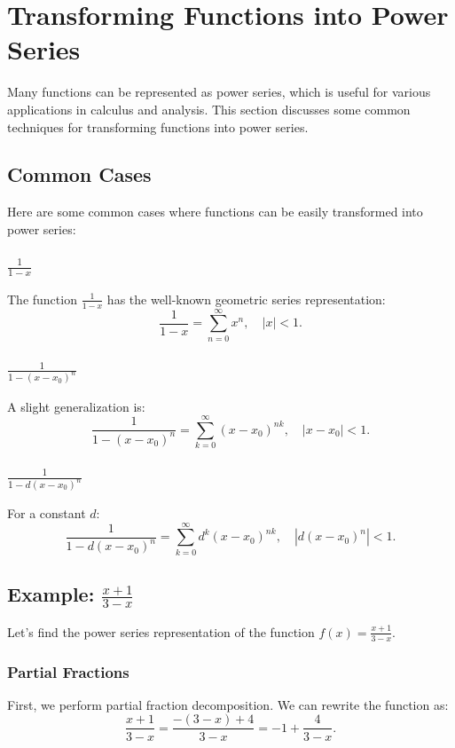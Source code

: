 \section{Transforming Functions into Power Series}

Many functions can be represented as power series, which is useful for various applications in calculus and analysis. This section discusses some common techniques for transforming functions into power series.

\subsection{Common Cases}
Here are some common cases where functions can be easily transformed into power series:

\subsubsection{\(\frac{1}{1 - x}\)}
The function \(\frac{1}{1 - x}\) has the well-known geometric series representation:
\[
\frac{1}{1 - x} = \sum_{n=0}^{\infty} x^n, \quad |x| < 1.
\]

\subsubsection{\(\frac{1}{1 - (x - x_0)^n}\)}
A slight generalization is:
\[
\frac{1}{1 - (x - x_0)^n} = \sum_{k=0}^{\infty} (x - x_0)^{nk}, \quad |x - x_0| < 1.
\]

\subsubsection{\(\frac{1}{1 - d(x - x_0)^n}\)}
For a constant \(d\):
\[
\frac{1}{1 - d(x - x_0)^n} = \sum_{k=0}^{\infty} d^k (x - x_0)^{nk}, \quad |d(x - x_0)^n| < 1.
\]

\subsection{Example: \(\frac{x + 1}{3 - x}\)}
Let's find the power series representation of the function \(f(x) = \frac{x + 1}{3 - x}\).

\subsubsection{Partial Fractions}
First, we perform partial fraction decomposition. We can rewrite the function as:
\[
\frac{x + 1}{3 - x} = \frac{-(3 - x) + 4}{3 - x} = -1 + \frac{4}{3 - x}.
\]

